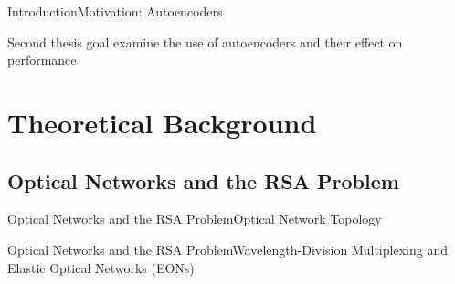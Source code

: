 \documentclass[english,aspectratio=169,dvipsnames]{beamer}
\begin{document}
\begin{frame}{Introduction}{Motivation: Autoencoders}
    \vspace{0.5cm}
    \begin{adjustwidth}{6mm}{2cm}
                \begin{itemize}
                    \setlength\itemsep{1em}
                \end{itemize}
    \end{adjustwidth}

    \begin{center}
     {
          \begin{minipage}{0.9\linewidth}
              \begin{exampleblock}{Second thesis goal}
                examine the use of autoencoders and their effect on performance
              \end{exampleblock}
          \end{minipage}
    }
   \end{center}
\end{frame}


\section{Theoretical Background}


\subsection{Optical Networks and the RSA Problem}

\begin{frame}{Optical Networks and the RSA Problem}{Optical Network Topology}
    \vspace{0.5cm}
	\begin{adjustwidth}{0cm}{0cm}
		\centering
		
	\end{adjustwidth}
\end{frame}

\begin{frame}{Optical Networks and the RSA Problem}{Wavelength-Division Multiplexing and Elastic Optical Networks (EONs)}
	  \vspace{0.0cm}
	\begin{adjustwidth}{0cm}{0cm}
		\centering
		
	\end{adjustwidth}
\end{frame}
\end{document}
